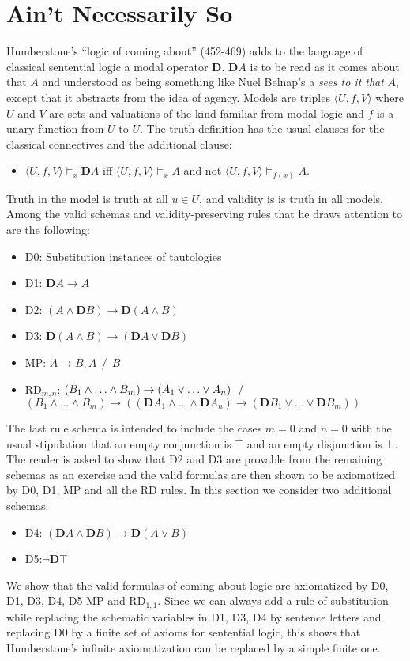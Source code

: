 \documentclass[11pt]{article}
\begin{document}
\section{Ain't Necessarily So}
Humberstone's ``logic of coming about'' (452-469) adds to the language of classical sentential logic a modal operator $\mathbf{D}$. $\mathbf{D}A$ is to be read as it comes about that $A$ and understood as being something like Nuel Belnap's a \textit{sees to it that} $A$, except that it abstracts from the idea of agency. Models are triples $\langle U,f,V\rangle $ where $U$ and $V$ are sets and valuations of the kind familiar from modal logic and $f$ is a unary function from $U$ to $U$. The truth definition has the usual clauses for the classical connectives and the additional clause:
\begin{itemize}[label={}]
\item{ $\langle U,f,V\rangle  \models _x \mathbf{D}A$ iff $\langle U,f,V\!\rangle  \models _x A$ and not $\langle U,f,V\!\rangle \models _{f(x)} A$.}\end{itemize} 
Truth in the model is truth at all $u{\in}U$, and validity is is truth in all models. Among the valid schemas and validity-preserving rules that he draws attention to are the following:
\begin{itemize}[label={}]
\setlength\itemsep{.2 pt}
\item{D0: Substitution instances of tautologies}
\item{D1: $\mathbf{D}A\rightarrow A$}
\item{D2: $(A\wedge\mathbf{D}B) \rightarrow \mathbf{D}(A\wedge B)$}
\item{D3: $\mathbf{D}(A\wedge B) \rightarrow (\mathbf{D}A\vee \mathbf{D}B)$}
\item{MP: $A\rightarrow B, A ~~/~~ B$}
\item{RD$_{m,n}$: $(B_1 \wedge {\ldots}\wedge B_m) \rightarrow (A_1\vee {\ldots}\vee A_n) ~~/ \\$\tab\tab$ (B_1 \wedge {\ldots}\wedge B_m) \rightarrow ((\mathbf{D}A_1\wedge {\ldots}\wedge \mathbf{D}A_n) \rightarrow (\mathbf{D}B_1 \vee {\ldots}\vee \mathbf{D}B_m))$}
\end{itemize}
The last rule schema is intended to include the cases $m=0$ and $n=0$ with the usual stipulation that an empty conjunction is $\top $ and an empty disjunction is $\bot$. The reader is asked to show that D2 and D3 are provable from the remaining schemas as an exercise and the valid formulas are then shown to be axiomatized by D0, D1, MP and all the RD rules. In this section we consider two additional schemas.
\begin{itemize}[label={}]
\item{D4: $(\mathbf{D}A\wedge \mathbf{D}B) \rightarrow \mathbf{D}(A\vee B)$}
\item{D5:$\neg \mathbf{D}\top $}
\end{itemize}
We show that the valid formulas of coming-about logic are axiomatized by D0, D1, D3, D4, D5 MP and RD$_{1,1}$. Since we can always add a rule of substitution while replacing the schematic variables in D1, D3, D4 by sentence letters and replacing D0 by a finite set of axioms for sentential logic, this shows that Humberstone's infinite axiomatization can be replaced by a simple finite one. 
\end{document}
